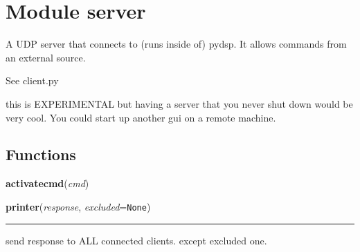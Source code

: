 %
%
%


\section{Module server}

    \label{server}
A UDP server that connects to  (runs inside of) pydsp. It allows commands 
from an external source.

See client.py

this is EXPERIMENTAL but having a server that you never shut down would be 
very cool. You could start up another gui on a remote machine.



  \subsection{Functions}

    \label{server:activatecmd}

    \vspace{0.5ex}

    \begin{boxedminipage}{\textwidth}

    \raggedright \textbf{activatecmd}(\textit{cmd})

    \end{boxedminipage}

    \label{server:printer}

    \vspace{0.5ex}

    \begin{boxedminipage}{\textwidth}

    \raggedright \textbf{printer}(\textit{response}, \textit{excluded}=\texttt{None})

    \vspace{-1.5ex}

    \rule{\textwidth}{0.5\fboxrule}
    send response to ALL connected clients. except excluded one.

    \vspace{1ex}

    \end{boxedminipage}

